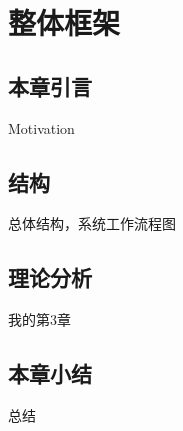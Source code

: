 \chapter{整体框架}
\label{cha:china}


\section{本章引言}
Motivation

\section{结构}
总体结构，系统工作流程图

\section{理论分析}
我的第3章


\section{本章小结}
总结
